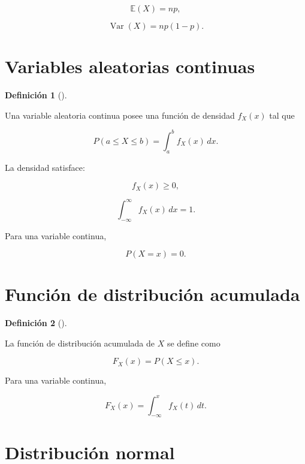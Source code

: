 \documentclass[
  spanish,
  10.5pt,
  letterpaper,
  DIV=11,
  numbers=noendperiod,
  oneside,
  open=any]{scrreprt}
\theoremstyle{definition}
\newtheorem{definition}{Definición}[chapter]
\theoremstyle{definition}
\theoremstyle{plain}
\theoremstyle{remark}
\begin{document}
\[
\mathbb{E}(X)=np,
\]

\[
\operatorname{Var}(X)=np(1-p).
\]

\section*{Variables aleatorias
continuas}\label{variables-aleatorias-continuas}


\begin{definition}[]\protect\hypertarget{def-variable-continua}{}\label{def-variable-continua}

Una variable aleatoria continua posee una función de densidad \(f_X(x)\)
tal que

\[
P(a\leq X\leq b)
=
\int_a^b f_X(x)\,dx.
\]

\end{definition}

La densidad satisface:

\[
f_X(x)\geq 0,
\]

\[
\int_{-\infty}^{\infty}f_X(x)\,dx=1.
\]

Para una variable continua,

\[
P(X=x)=0.
\]

\section*{Función de distribución
acumulada}\label{funciuxf3n-de-distribuciuxf3n-acumulada}


\begin{definition}[]\protect\hypertarget{def-funcion-distribucion}{}\label{def-funcion-distribucion}

La función de distribución acumulada de \(X\) se define como

\[
F_X(x)
=
P(X\leq x).
\]

\end{definition}

Para una variable continua,

\[
F_X(x)
=
\int_{-\infty}^{x}
f_X(t)\,dt.
\]

\section*{Distribución normal}\label{distribuciuxf3n-normal}
\end{document}
